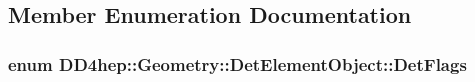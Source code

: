 \subsection{Member Enumeration Documentation}
\hypertarget{class_d_d4hep_1_1_geometry_1_1_det_element_object_a04115ec0fa8d9df9b7d47ed45e9b037d}{
\subsubsection[{DetFlags}]{\setlength{\rightskip}{0pt plus 5cm}enum {\bf DD4hep::Geometry::DetElementObject::DetFlags}}}
\label{class_d_d4hep_1_1_geometry_1_1_det_element_object_a04115ec0fa8d9df9b7d47ed45e9b037d}
